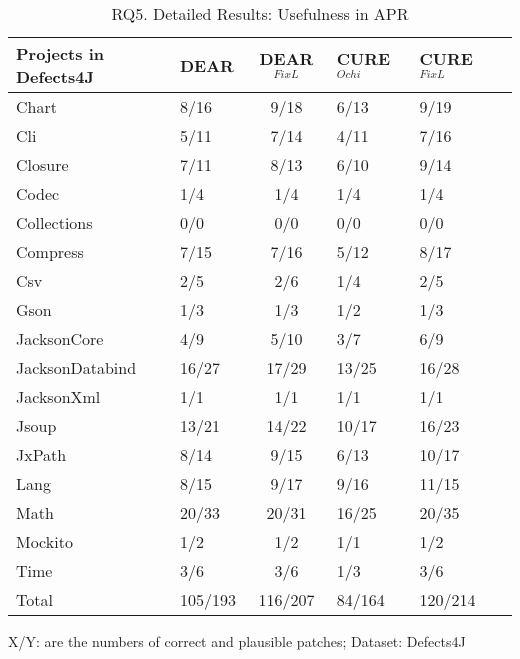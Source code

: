 \begin{table}[t]
	\caption{RQ5. Detailed Results: Usefulness in APR}
	\vspace{-10pt}
	\begin{center}
        \scriptsize
		\renewcommand{\arraystretch}{1} 
		\begin{tabular}{l|p{0.8cm}<{\centering}c|p{0.8cm}<{\centering}p{0.8cm}<{\centering}p{0.8cm}<{\centering}}
			
		    \hline
		    Projects in Defects4J 	    & DEAR  & DEAR$^{FixL}$ & CURE$^{Ochi}$  & CURE$^{FixL}$  \\
		    \hline
		    Chart       	& 8/16  &  9/18      & 6/13     & 9/19         \\
		    Cli        	    & 5/11  &  7/14 	 & 4/11  	  & 7/16         \\
		    Closure     	& 7/11  &  8/13  	 & 6/10   	  & 9/14         \\
		    Codec       	& 1/4   &  1/4  	 & 1/4    	  & 1/4          \\
		    Collections 	& 0/0   &  0/0       & 0/0     	  & 0/0          \\
		    Compress   		& 7/15  &  7/16      & 5/12   	  & 8/17         \\
		    Csv         	& 2/5   &  2/6       & 1/4    	  & 2/5          \\
		    Gson            & 1/3   &  1/3       & 1/2    	  & 1/3          \\
		    JacksonCore     & 4/9   &  5/10      & 3/7     	  & 6/9          \\
		    JacksonDatabind & 16/27 &  17/29     & 13/25  	  & 16/28        \\
		    JacksonXml      & 1/1   &  1/1       & 1/1     	  & 1/1          \\
		    Jsoup           & 13/21 &  14/22     & 10/17  	  & 16/23        \\
		    JxPath          & 8/14  &  9/15      & 6/13   	  & 10/17        \\
		    Lang            & 8/15  &  9/17      & 9/16  	  & 11/15        \\
		    Math            & 20/33 &  20/31     & 16/25  	  & 20/35        \\
		    Mockito         & 1/2   &  1/2       & 1/1    	  & 1/2          \\
		    Time            & 3/6   &  3/6       & 1/3    	  & 3/6          \\
			\hline
			Total           & 105/193  &  116/207  & 84/164       & 120/214         \\
			\hline
		\end{tabular}

{\footnotesize X/Y: are the numbers of correct and plausible patches; Dataset: Defects4J}
		\label{RQ5_2}
	\end{center}
\vspace{-5pt}
\end{table}

